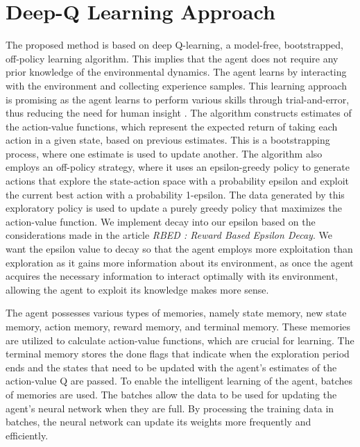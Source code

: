 \documentclass[letterpaper]{article} %
\begin{document}
\section{Deep-Q Learning Approach}\label{dqlapr}

The proposed method is based on deep Q-learning, a model-free, bootstrapped, off-policy learning algorithm. This implies that the agent does not require any prior knowledge of the environmental dynamics. The agent learns by interacting with the environment and collecting experience samples. This learning approach is promising as the agent learns to perform various skills through trial-and-error, thus reducing the need for human insight \cite{2018-TOG-deepMimic}. The algorithm constructs estimates of the action-value functions, which represent the expected return of taking each action in a given state, based on previous estimates. This is a bootstrapping process, where one estimate is used to update another. The algorithm also employs an off-policy strategy, where it uses an epsilon-greedy policy to generate actions that explore the state-action space with a probability epsilon and exploit the current best action with a probability 1-epsilon. The data generated by this exploratory policy is used to update a purely greedy policy that maximizes the action-value function. We implement decay into our epsilon based on the considerations made in the article \textit{RBED : Reward Based Epsilon Decay}. We want the epsilon value to decay so that the agent employs more exploitation than exploration as it gains more information about its environment, as once the agent acquires the necessary information to interact optimally with its environment, allowing the agent to exploit its knowledge makes more sense.  

\par The agent possesses various types of memories, namely state memory, new state memory, action memory, reward memory, and terminal memory. These memories are utilized to calculate action-value functions, which are crucial for learning. The terminal memory stores the done flags that indicate when the exploration period ends and the states that need to be updated with the agent's estimates of the action-value Q are passed. To enable the intelligent learning of the agent, batches of memories are used. The batches allow the data to be used for updating the agent's neural network when they are full. By processing the training data in batches, the neural network can update its weights more frequently and efficiently.
\end{document}
